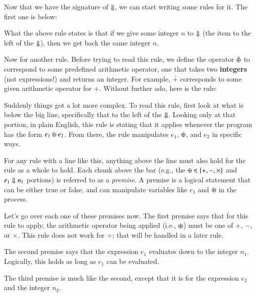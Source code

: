 \documentclass[nocopyrightspace]{sigplanconf}
\begin{document}
Now that we have the signature of $\Downarrow$, we can start writing some rules for it.
The first one is below:


What the above rule states is that if we give some integer $n$ to $\Downarrow$ (the item to the left of the $\Downarrow$), then we get back the same integer $n$.

Now for another rule.
Before trying to read this rule, we define the operator $\bar{\oplus}$ to correspond to some predefined arithmetic operator, one that takes two \textbf{integers} (not expressions!) and returns an integer.
For example, $\bar{+}$ corresponds to some given arithmetic operator for $+$.
Without further ado, here is the rule:


Suddenly things got a lot more complex.
To read this rule, first look at what is below the big line, specifically that to the left of the $\Downarrow$.
Looking only at that portion, in plain English, this rule is stating that it applies whenever the program has the form $e_1 \oplus e_2$.
From there, the rule manipulates $e_1$, $\oplus$, and $e_2$ in specific ways.

For any rule with a line like this, anything above the line must also hold for the rule as a whole to hold.
Each chunk above the bar (e.g., the $\oplus \in \{ +, -, \times \}$ and $e_1 \Downarrow n_1$ portions) is referred to as a \emph{premise}.
A premise is a logical statement that can be either true or false, and can manipulate variables like $e_1$ and $\oplus$ in the process.

Let's go over each one of these premises now.
The first premise says that for this rule to apply, the arithmetic operator being applied (i.e., $\oplus$) must be one of $+$, $-$, or $\times$.
This rule does not work for $\div$; that will be handled in a later rule.

The second premise says that the expression $e_1$ evaluates down to the integer $n_1$.
Logically, this holds as long as $e_1$ can be evaluated.

The third premise is much like the second, except that it is for the expression $e_2$ and the integer $n_2$.
\end{document}
